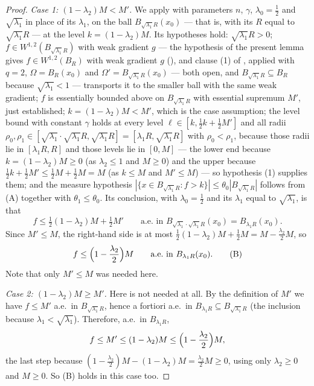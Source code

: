 \begin{proof}
\emph{Case 1: $(1-\lambda_2)M<M'$.}  We apply
 with parameters $n$, $\gamma$,
$\lambda_0=\frac12$ and $\sqrt{\lambda_1}$ in place of its $\lambda_1$, on the
ball $B_{\sqrt{\lambda_1}R}(x_0)$ --- that is, with its $R$ equal to
$\sqrt{\lambda_1}R$ --- at the level $k=(1-\lambda_2)M$.  Its hypotheses hold:
$\sqrt{\lambda_1}R>0$; $f\in W^{1,2}(B_{\sqrt{\lambda_1}R})$ with weak gradient
$g$ --- the hypothesis of the present lemma gives
$f\in W^{1,2}(B_R)$ with weak gradient $g$ (), and clause (1) of
, applied with $q=2$, $\Omega=B_R(x_0)$ and
$\Omega'=B_{\sqrt{\lambda_1}R}(x_0)$ --- both open, and
$B_{\sqrt{\lambda_1}R}\subseteq B_R$ because $\sqrt{\lambda_1}<1$ --- transports it
to the smaller ball with the same weak gradient; $f$ is essentially bounded above on
$B_{\sqrt{\lambda_1}R}$ with
essential supremum $M'$, just established; $k=(1-\lambda_2)M<M'$, which is the
case assumption; the level bound with constant $\gamma$ holds at every level
$\ell\in[k,\frac12k+\frac12M']$ and all radii
$\rho_0,\rho_1\in[\sqrt{\lambda_1}\cdot\sqrt{\lambda_1}R,\sqrt{\lambda_1}R]
=[\lambda_1R,\sqrt{\lambda_1}R]$ with $\rho_0<\rho_1$, because those radii lie in
$[\lambda_1R,R]$ and those levels lie in $[0,M]$ --- the lower end because
$k=(1-\lambda_2)M\ge0$ (as $\lambda_2\le1$ and $M\ge0$) and the upper because
$\frac12k+\frac12M'\le\frac12M+\frac12M=M$ (as $k\le M$ and $M'\le M$) --- so
hypothesis (1) supplies them; and the measure hypothesis
$|\{x\in B_{\sqrt{\lambda_1}R}:f>k\}|\le\theta_0|B_{\sqrt{\lambda_1}R}|$ follows
from (A) together with $\theta_1\le\theta_0$.  Its conclusion, with
$\lambda_0=\frac12$ and its $\lambda_1$ equal to $\sqrt{\lambda_1}$, is that
\[
f\le\tfrac12(1-\lambda_2)M+\tfrac12M'
\qquad\text{a.e.\ in }B_{\sqrt{\lambda_1}\cdot\sqrt{\lambda_1}R}(x_0)
=B_{\lambda_1R}(x_0) .
\]
Since $M'\le M$, the right-hand side is at most
$\frac12(1-\lambda_2)M+\frac12M=M-\frac{\lambda_2}2M$, so
\[
f\le\Bigl(1-\frac{\lambda_2}2\Bigr)M\qquad\text{a.e.\ in }B_{\lambda_1R}(x_0) .
\tag{B}
\]
Note that only $M'\le M$ was needed here.

\emph{Case 2: $(1-\lambda_2)M\ge M'$.}  Here
 is not needed at all.  By the
definition of $M'$ we have $f\le M'$ a.e.\ in $B_{\sqrt{\lambda_1}R}$, hence a
fortiori a.e.\ in $B_{\lambda_1R}\subseteq B_{\sqrt{\lambda_1}R}$ (the inclusion
because $\lambda_1<\sqrt{\lambda_1}$).  Therefore, a.e.\ in $B_{\lambda_1R}$,
\[
f\le M'\le(1-\lambda_2)M\le\Bigl(1-\frac{\lambda_2}2\Bigr)M ,
\]
the last step because $(1-\frac{\lambda_2}2)M-(1-\lambda_2)M
=\frac{\lambda_2}2M\ge0$, using only $\lambda_2\ge0$ and $M\ge0$.  So (B) holds
in this case too.


\end{proof}
